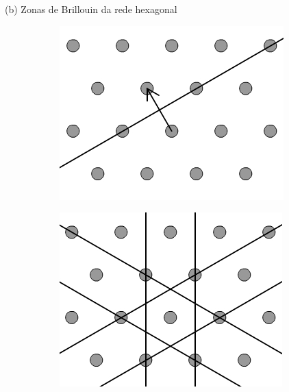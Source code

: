 \documentclass[aspectratio=169]{beamer}
\begin{document}
\begin{frame}{(b) Zonas de Brillouin da rede hexagonal}

\begin{figure}[H]
\centering
\begin{subfigure}{.45\textwidth}
  \centering
  \includegraphics[width=\linewidth]{fig/hexbz_construct-1.png}
\end{subfigure}%
\quad \quad
\begin{subfigure}{.45\textwidth}
  \centering
  \includegraphics[width=\linewidth]{fig/hexbz_construct-2.png}
\end{subfigure}
\end{figure}

\end{frame}
\end{document}
